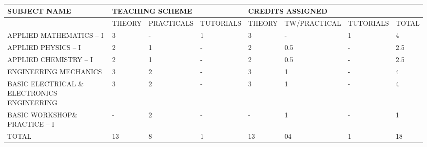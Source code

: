 \documentclass{article} %
\begin{document}
\begin{tabular}{|p{1.3in}|p{0.4in}|p{0.6in}|p{0.5in}|p{0.4in}|p{0.5in}|p{0.5in}|p{0.4in}|} \hline 
SUBJECT NAME & \multicolumn{3}{|p{1.5in}|}{TEACHING SCHEME} & \multicolumn{4}{|p{1.8in}|}{CREDITS ASSIGNED} \\ \hline 
 & THEORY & PRACTICALS & TUTORIALS & THEORY & TW/\newline PRACTICAL & TUTORIALS & TOTAL \\ \hline 
\newline APPLIED MATHEMATICS -- I\newline  & 3 & - & 1 & 3 & - & 1 & 4 \\ \hline 
\newline APPLIED PHYSICS -- I\newline  & 2 & 1 & - & 2 & 0.5 & - & 2.5 \\ \hline 
\newline APPLIED CHEMISTRY -- I\newline  & 2 & 1 & - & 2 & 0.5 & - & 2.5 \\ \hline 
\newline ENGINEERING MECHANICS\newline  & 3 & 2 & - & 3 & 1 & - & 4 \\ \hline 
BASIC ELECTRICAL \& ELECTRONICS ENGINEERING & 3 & 2 & - & 3 & 1 & - & 4 \\ \hline 
\newline BASIC WORKSHOP\& PRACTICE -- I & - & 2 & - & - & 1 & - & 1 \\ \hline 
TOTAL & 13 & 8 & 1 & 13 & 04 & 1 & 18 \\ \hline 
\end{tabular}



\noindent 

\noindent 

\noindent 

\noindent 

\noindent 

\noindent 

\noindent 

\noindent 

\noindent 

\noindent 

\noindent 

\noindent 

\noindent 

\noindent 

\noindent 

\noindent 
\end{document}
